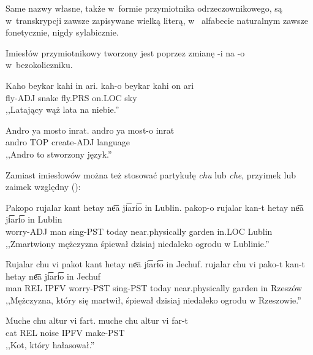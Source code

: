 \begin{spacing}{1.1}
Same nazwy własne, także w~formie przymiotnika odrzeczownikowego, są
w~transkrypcji zawsze zapisywane wielką literą, w~ alfabecie naturalnym zawsze
fonetycznie, nigdy sylabicznie.

Imiesłów przymiotnikowy tworzony jest poprzez zmianę -i na -o w~bezokoliczniku.

\begin{exe}
	\ex
	\trans Kaho beykar kahi in ari.
	\gll kah-o beykar kahi on ari\\
	  fly-ADJ snake fly.PRS on.LOC sky\\
	\glt  ,,Latający wąż lata na niebie.''
\end{exe}

\begin{exe}
	\ex
	\trans Andro ya mosto inrat.
	\gll andro ya most-o inrat\\
	  andro TOP create-ADJ language\\
	\glt  ,,Andro to stworzony język.''
\end{exe}

Zamiast imiesłowów można też stosować partykułę \emph{chu} lub \emph{che},
przyimek lub zaimek względny (\Rel{}):

\begin{exe}
	\ex
	\trans Pakopo rujalar kant hetay ne͞a ji͞ari͞o in Lublin.
	\gll pakop-o rujalar kan-t hetay ne͞a ji͞ari͞o in Lublin\\
	  worry-ADJ man sing-PST today near.physically garden in.LOC Lublin\\
	\glt  ,,Zmartwiony mężczyzna śpiewał dzisiaj niedaleko ogrodu w Lublinie.''
\end{exe}

\begin{exe}
	\ex
	\trans Rujalar chu vi pakot kant hetay ne͞a ji͞ari͞o in Jechuf.
	\gll rujalar chu vi pako-t kan-t hetay ne͞a ji͞ari͞o in Jechuf\\
	  man REL IPFV worry-PST sing-PST today near.physically garden in Rzeszów\\
	\glt  ,,Mężczyzna, który się martwił, śpiewał dzisiaj niedaleko ogrodu w Rzeszowie.''
\end{exe}

\begin{exe}
	\ex
	\trans Muche chu altur vi fart.
	\gll muche chu altur vi far-t\\
	  cat REL noise IPFV make-PST\\
	\glt  ,,Kot, który hałasował.''
\end{exe}


\end{spacing}
